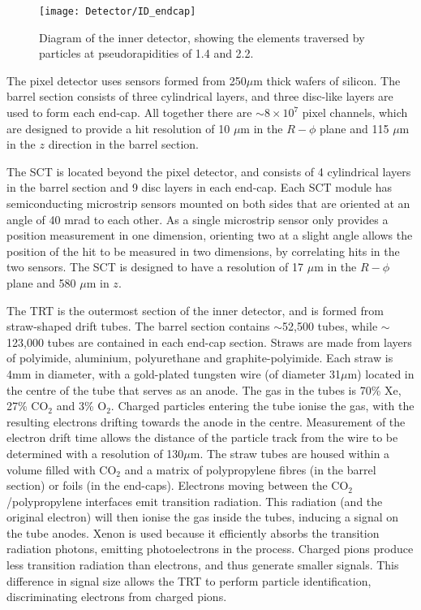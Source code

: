 \begin{figure}[p]
\begin{center}
\texttt{[image: Detector/ID\_endcap]}
\end{center}
\caption[Diagram of the inner detector]{Diagram of the inner detector, showing the elements traversed by particles at pseudorapidities of 1.4 and 2.2.}
\label{fig_ID_EC}
\end{figure}

The pixel detector uses sensors formed from 250$\mu$m thick wafers of silicon. The barrel section consists of three cylindrical layers, and three disc-like layers are used to form each end-cap. All together there are $\sim 8 \times 10^7$ pixel channels, which are designed to provide a hit resolution of 10 $\mu$m in the $R-\phi$ plane and 115 $\mu$m in the $z$ direction in the barrel section. 

The SCT is located beyond the pixel detector, and consists of 4 cylindrical layers in the barrel section and 9 disc layers in each end-cap. Each SCT module has semiconducting microstrip sensors mounted on both sides that are oriented at an angle of 40 mrad to each other. As a single microstrip sensor only provides a position measurement in one dimension, orienting two at a slight angle allows the position of the hit to be measured in two dimensions, by correlating hits in the two sensors. The SCT is designed to have a resolution of 17 $\mu$m in the $R-\phi$ plane and 580 $\mu$m in $z$.

The TRT is the outermost section of the inner detector, and is formed from straw-shaped drift tubes. The barrel section contains $\sim$52,500 tubes, while $\sim$123,000 tubes are contained in each end-cap section. Straws are made from layers of polyimide, aluminium, polyurethane and graphite-polyimide. Each straw is 4mm in diameter, with a gold-plated tungsten wire (of diameter 31$\mu$m) located in the centre of the tube that serves as an anode. The gas in the tubes is 70\% Xe, 27\% $\mathrm{CO}_2$ and 3\% $\mathrm{O}_2$. Charged particles entering the tube ionise the gas, with the resulting electrons drifting towards the anode in the centre. Measurement of the electron drift time allows the distance of the particle track from the wire to be determined with a resolution of 130$\mu$m. 
The straw tubes are housed within a volume filled with $\mathrm{CO}_2$ and a matrix of polypropylene fibres (in the barrel section) or foils (in the end-caps). Electrons moving between the $\mathrm{CO}_2$/polypropylene interfaces emit transition radiation. This radiation (and the original electron) will then ionise the gas inside the tubes, inducing a signal on the tube anodes. Xenon is used because it efficiently absorbs the transition radiation photons, emitting photoelectrons in the process. Charged pions produce less transition radiation than electrons, and thus generate smaller signals. This difference in signal size allows the TRT to perform particle identification, discriminating electrons from charged pions.

